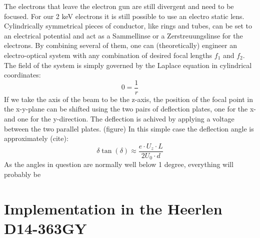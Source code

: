 The electrons that leave the electron gun are still divergent and need to be focused. For our 2 keV electrons it is still possible to use an electro static lens. Cylindrically symmetrical pieces of conductor, like rings and tubes, can be set to an electrical potential and act as a Sammellinse or a Zerstreuungslinse for the electrons. By combining several of them, one can (theoretically) engineer an electro-optical system with any combination of desired focal lengths $f_1$ and $f_2$. The field of the system is simply governed by the Laplace equation in cylindrical coordinates:
\begin{equation}
	0=\dfrac{1}{r}%
\end{equation}
If we take the axis of the beam to be the z-axis, the position of the focal point in the x-y-plane can be shifted using the two pairs of deflection plates, one for the x- and one for the y-direction. The deflection is achived by applying a voltage between the two parallel plates. (figure) In this simple case the deflection angle is approximately (cite):
\begin{equation}\label{key}
\delta \tan(\delta) \approx \frac{e \cdot U_z\cdot L}{2 U_0 \cdot d}
\end{equation}
As the angles in question are normally well below 1 degree, everything will probably be 

\section{Implementation in the Heerlen D14-363GY }


